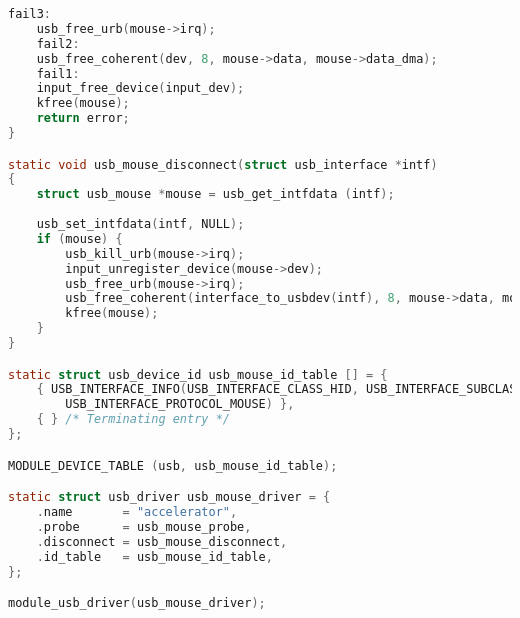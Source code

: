 \begin{lstlisting}[language=C, label=lst:all, caption=Полный код драйвера]
	fail3:
	usb_free_urb(mouse->irq);
	fail2:
	usb_free_coherent(dev, 8, mouse->data, mouse->data_dma);
	fail1:
	input_free_device(input_dev);
	kfree(mouse);
	return error;
}

static void usb_mouse_disconnect(struct usb_interface *intf)
{
	struct usb_mouse *mouse = usb_get_intfdata (intf);
	
	usb_set_intfdata(intf, NULL);
	if (mouse) {
		usb_kill_urb(mouse->irq);
		input_unregister_device(mouse->dev);
		usb_free_urb(mouse->irq);
		usb_free_coherent(interface_to_usbdev(intf), 8, mouse->data, mouse->data_dma);
		kfree(mouse);
	}
}

static struct usb_device_id usb_mouse_id_table [] = {
	{ USB_INTERFACE_INFO(USB_INTERFACE_CLASS_HID, USB_INTERFACE_SUBCLASS_BOOT,
		USB_INTERFACE_PROTOCOL_MOUSE) },
	{ }	/* Terminating entry */
};

MODULE_DEVICE_TABLE (usb, usb_mouse_id_table);

static struct usb_driver usb_mouse_driver = {
	.name		= "accelerator",
	.probe		= usb_mouse_probe,
	.disconnect	= usb_mouse_disconnect,
	.id_table	= usb_mouse_id_table,
};

module_usb_driver(usb_mouse_driver);


\end{lstlisting}